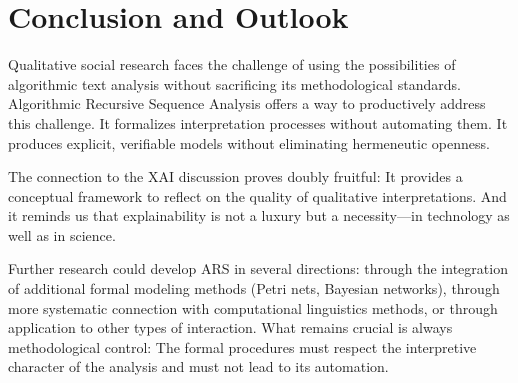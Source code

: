 \documentclass[
  12pt,
  a4paper,
  oneside,
  titlepage
]{article}
\begin{document}
\section{Conclusion and Outlook}

Qualitative social research faces the challenge of using the possibilities of 
algorithmic text analysis without sacrificing its methodological standards. 
Algorithmic Recursive Sequence Analysis offers a way to productively address this 
challenge. It formalizes interpretation processes without automating them. It 
produces explicit, verifiable models without eliminating hermeneutic openness.

The connection to the XAI discussion proves doubly fruitful: It provides a conceptual 
framework to reflect on the quality of qualitative interpretations. And it reminds 
us that explainability is not a luxury but a necessity—in technology as well as in 
science.

Further research could develop ARS in several directions: through the integration 
of additional formal modeling methods (Petri nets, Bayesian networks), through more 
systematic connection with computational linguistics methods, or through application 
to other types of interaction. What remains crucial is always methodological control: 
The formal procedures must respect the interpretive character of the analysis and 
must not lead to its automation.
\end{document}
